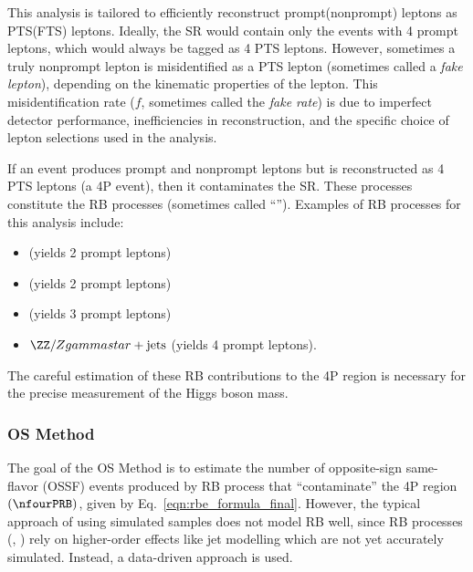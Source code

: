 This analysis is tailored to efficiently reconstruct prompt(nonprompt) leptons as PTS(FTS) leptons.
Ideally, the SR would contain only the events with 4 prompt leptons, which would always be tagged as 4 PTS leptons.
However, sometimes a truly nonprompt lepton is misidentified as a PTS lepton (sometimes called a \emph{fake lepton}), depending on the kinematic properties of the lepton.
This misidentification rate ($f$, sometimes called the \emph{fake rate}) is due to imperfect detector performance, inefficiencies in reconstruction, and the specific choice of lepton selections used in the analysis.

If an event produces prompt and nonprompt leptons but is reconstructed as 4 PTS leptons (a 4P event), then it contaminates the SR.
These processes constitute the RB processes (sometimes called ``\ZplusX'').
Examples of RB processes for this analysis include:
\begin{itemize}
	\item \Zplusjets (yields 2 prompt leptons)
	\item \ttbarplusjets (yields 2 prompt leptons)
	\item \WZplusjets (yields 3 prompt leptons)
	\item $\ZZ/Zgammastar + \text{jets}$ (yields 4 prompt leptons).
\end{itemize}
The careful estimation of these RB contributions to the 4P region is necessary for the precise measurement of the Higgs boson mass.

\subsubsection{OS Method}
The goal of the OS Method is to estimate the number of opposite-sign same-flavor (OSSF) \fourl events produced by RB process that ``contaminate'' the 4P region $\left( \nfourPRB \right)$, given by Eq.~\ref{eqn:rbe_formula_final}.
However, the typical approach of using simulated samples does not model RB well, since RB processes (\eg, \Zplusjets) rely on higher-order effects like jet modelling which are not yet accurately simulated.
Instead, a data-driven approach is used.

